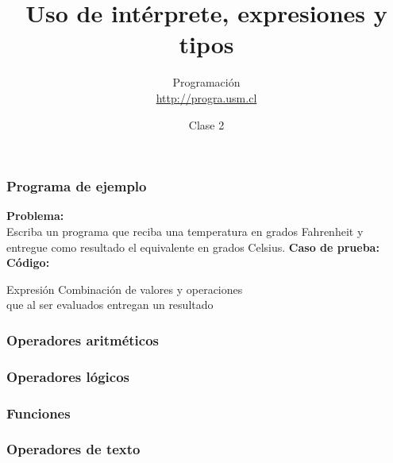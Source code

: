 \documentclass[12pt]{beamer}
\title{Uso de intérprete, expresiones y tipos}
\author{
  Programación \\ \url{http://progra.usm.cl}
}
\date{Clase 2}
\begin{document}
  \begin{frame}
    \maketitle
  \end{frame}

  \begin{frame}
    \frametitle{Programa de ejemplo}
    \label{prog-ejemplo}

    \textbf{Problema:}\\
    Escriba un programa que reciba una temperatura en grados Fahrenheit
    y entregue como resultado el equivalente en grados Celsius.
    \vfill
    \textbf{Caso de prueba:}\\
    
    \vfill
    \textbf{Código:}\\
    
  \end{frame}

  \begin{frame}
    \label{expresion}
    \begin{block}{Expresión}
      Combinación de valores y operaciones \\
      que al ser evaluados entregan un resultado
    \end{block}
    
  \end{frame}

  \begin{frame}
    \frametitle{Operadores aritméticos}
    \label{operadores-aritmeticos}
    
  \end{frame}

  \begin{frame}
    \frametitle{Operadores lógicos}
    \label{operadores-logicos}
    
  \end{frame}

  \begin{frame}
    \frametitle{Funciones}
    \label{funciones}
    
  \end{frame}

  \begin{frame}
    \frametitle{Operadores de texto}
    \label{operadores-texto}
    
  \end{frame}
\end{document}

